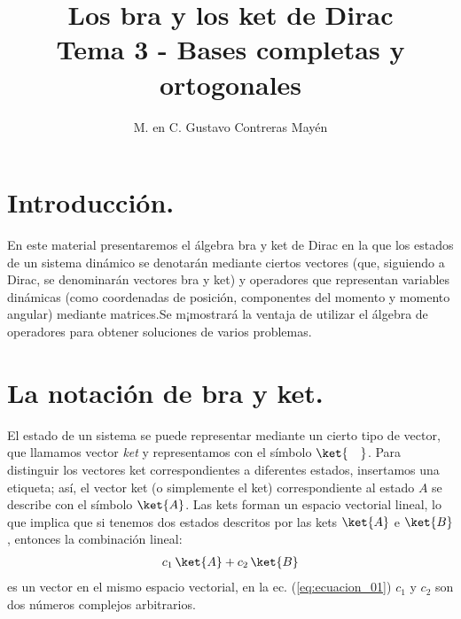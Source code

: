
\title{Los bra y los ket de Dirac \\ \large {Tema 3 - Bases completas y ortogonales}\vspace{-3ex}}

\author{M. en C. Gustavo Contreras Mayén}
\date{ }

\pagestyle{fancy}
\fancyhf{}
\lhead{\leftmark}
\rfoot{\thepage}
\setlength{\headheight}{16pt}%



\maketitle
\fontsize{14}{14}\selectfont
\tableofcontents
\newpage

\section{Introducción.}

En este material presentaremos el álgebra bra y ket de Dirac en la que los estados de un sistema dinámico se denotarán mediante ciertos vectores (que, siguiendo a Dirac, se denominarán vectores bra y ket) y operadores que representan variables dinámicas (como coordenadas de posición, componentes del momento y momento angular) mediante matrices.Se m¡mostrará la ventaja de utilizar el álgebra de operadores para obtener soluciones de varios problemas.

\section{La notación de bra y ket.}

El estado de un sistema se puede representar mediante un cierto tipo de vector, que llamamos vector \emph{ket} y representamos con el símbolo $\ket{ \quad }$. Para distinguir los vectores ket correspondientes a diferentes estados, insertamos una etiqueta; así, el vector ket (o simplemente el ket) correspondiente al estado $A$ se describe con el símbolo $\ket{A}$. Las kets forman un espacio vectorial lineal, lo que implica que si tenemos dos estados descritos por las kets $\ket{A}$ e $\ket{B}$, entonces la combinación lineal:
\begin{align}
c_{1} \, \ket{A} + c_{2} \, \ket{B}
\label{eq:ecuacion_01}
\end{align}
es un vector en el mismo espacio vectorial, en la ec. (\ref{eq:ecuacion_01}) $c_{1}$ y $c_{2}$ son dos números complejos arbitrarios.

